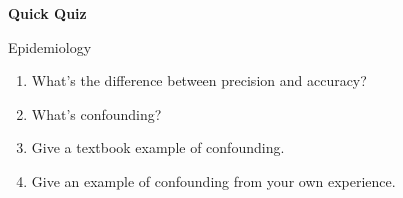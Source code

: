 \hspace*{3in}{This quiz is anonymous.}

\bigskip

\bigskip

\centerline{\Large \bfseries Quick Quiz}

\bigskip

\centerline{\large \sf Epidemiology}

\bigskip

\bigskip

\begin{enumerate}
\item What's the difference between precision and accuracy?

\vspace*{.5in}

\item What's confounding?

\vspace*{.5in}

\item Give a textbook example of confounding.

\vspace*{.5in}

\item Give an example of confounding from your own experience.

\vspace*{.5in}

\end{enumerate}
